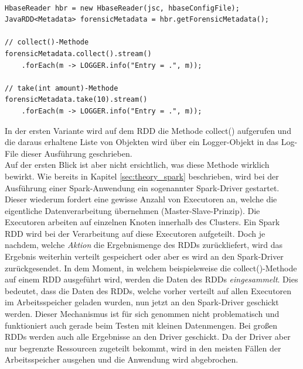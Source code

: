 \begin{lstlisting}[label={lst:spark_rdd_collect},caption= Anzeige der Ergebnisse eines Spark RDDs ,captionpos=b,frame=single,style=customjava]

HbaseReader hbr = new HbaseReader(jsc, hbaseConfigFile);
JavaRDD<Metadata> forensicMetadata = hbr.getForensicMetadata();

// collect()-Methode
forensicMetadata.collect().stream()
	.forEach(m -> LOGGER.info("Entry = .", m));

// take(int amount)-Methode	
forensicMetadata.take(10).stream()
	.forEach(m -> LOGGER.info("Entry = .", m));	
\end{lstlisting}

\noindent
In der ersten Variante wird auf dem RDD die Methode collect() aufgerufen und die daraus erhaltene Liste von Objekten wird über ein Logger-Objekt in das Log-File dieser Ausführung geschrieben.\\
Auf der ersten Blick ist aber nicht ersichtlich, was diese Methode wirklich bewirkt. Wie bereits in Kapitel \ref{sec:theory_spark} beschrieben, wird bei der Ausführung einer Spark-Anwendung ein sogenannter Spark-Driver gestartet. Dieser wiederum fordert eine gewisse Anzahl von Executoren an, welche die eigentliche Datenverarbeitung übernehmen (Master-Slave-Prinzip). Die Executoren arbeiten auf einzelnen Knoten innerhalb des Clusters. Ein Spark RDD wird bei der Verarbeitung auf diese Executoren aufgeteilt. Doch je nachdem, welche \textit{Aktion} die Ergebnismenge des RDDs zurückliefert, wird das Ergebnis weiterhin verteilt gespeichert oder aber es wird an den Spark-Driver zurückgesendet. In dem Moment, in welchem beispielsweise die collect()-Methode auf einem RDD ausgeführt wird, werden die Daten des RDDs \textit{eingesammelt}. Dies bedeutet, dass die Daten des RDDs, welche vorher verteilt auf allen Executoren im Arbeitsspeicher geladen wurden, nun jetzt an den Spark-Driver geschickt werden. Dieser Mechanismus ist für sich genommen nicht problematisch und funktioniert auch gerade beim Testen mit kleinen Datenmengen. Bei großen RDDs werden auch alle Ergebnisse an den Driver geschickt. Da der Driver aber nur begrenzte Ressourcen zugeteilt bekommt, wird in den meisten Fällen der Arbeitsspeicher ausgehen und die Anwendung wird abgebrochen.\\

